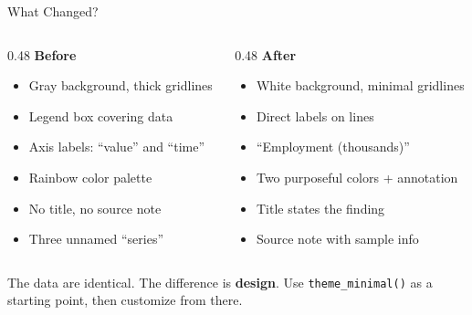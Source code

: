 \begin{frame}{What Changed?}
  \begin{columns}[T]
    \begin{column}{0.48\textwidth}
      \textbf{\textcolor{red!60}{Before}}
      \begin{itemize}\setlength\itemsep{1pt}
        \item Gray background, thick gridlines
        \item Legend box covering data
        \item Axis labels: ``value'' and ``time''
        \item Rainbow color palette
        \item No title, no source note
        \item Three unnamed ``series''
      \end{itemize}
    \end{column}
    \begin{column}{0.48\textwidth}
      \textbf{\textcolor{usfgreen}{After}}
      \begin{itemize}\setlength\itemsep{1pt}
        \item White background, minimal gridlines
        \item Direct labels on lines
        \item ``Employment (thousands)''
        \item Two purposeful colors + annotation
        \item Title states the finding
        \item Source note with sample info
      \end{itemize}
    \end{column}
  \end{columns}

  \vspace{8pt}

  The data are identical. The difference is \textbf{design}. Use \texttt{theme\_minimal()} as a starting point, then customize from there.
\end{frame}


